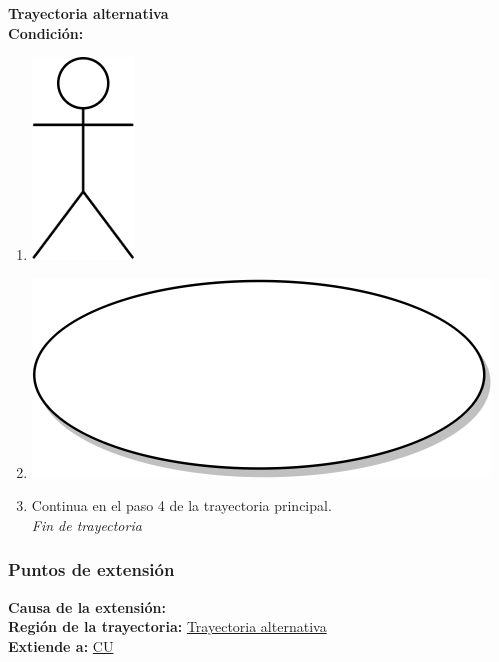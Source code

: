 \textbf{Trayectoria alternativa} \label{cu_ta_} \\
\textbf{Condición:} \\
 \begin{enumerate}[label=\arabic*]
    \item {\includegraphics[scale=.1]{Capitulo3/img/actor.png} }
    \item {\includegraphics[scale=.05]{Capitulo3/img/proceso.png}}
    \item {Continua en el paso 4 de la trayectoria principal.} \\
    \textit{Fin de trayectoria} \\
\end{enumerate}

\subsubsection{Puntos de extensión}
\noindent \textbf{Causa de la extensión:} \\
\textbf{Región de la trayectoria:} \hyperref[cu_ta_]{Trayectoria alternativa } \\
\textbf{Extiende a:} \hyperref[cu]{CU}
